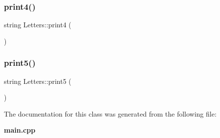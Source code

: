 \mbox{\label{class_letters_a2956a7cb230c1862fc6be9637db7e080}} 
\subsubsection{print4()}
{\footnotesize\ttfamily string Letters\+::print4 (\begin{DoxyParamCaption}{ }\end{DoxyParamCaption})\hspace{0.3cm}{\ttfamily [inline]}}

\mbox{\label{class_letters_adf8abdf2a758e4259e562395df87bb02}} 
\subsubsection{print5()}
{\footnotesize\ttfamily string Letters\+::print5 (\begin{DoxyParamCaption}{ }\end{DoxyParamCaption})\hspace{0.3cm}{\ttfamily [inline]}}



The documentation for this class was generated from the following file\+:\begin{DoxyCompactItemize}
\item 
\textbf{ main.\+cpp}\end{DoxyCompactItemize}
